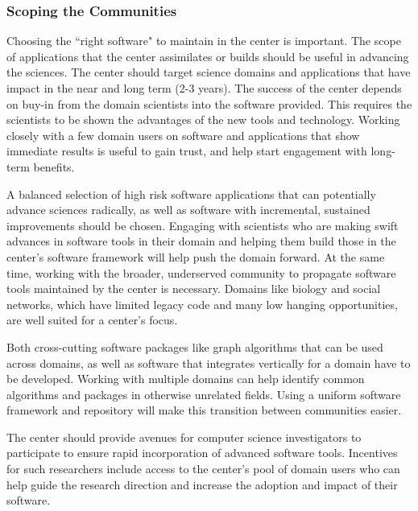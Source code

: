 \subsubsection{Scoping the Communities}
Choosing the ``right software" to maintain in the center is important. The scope of applications that the center assimilates or builds should be useful in advancing the sciences. The center should target science domains and applications that have impact in the near and long term (2-3 years). The success of the center depends on buy-in from the domain scientists into the software provided. This requires the scientists to be shown the advantages of the new tools and technology. Working closely with a few domain users on software and applications that show immediate results is useful to gain trust, and help start engagement with long-term benefits.

A balanced selection of high risk software applications that can potentially advance sciences radically, as well as software with incremental, sustained improvements should be chosen. Engaging with scientists who are making swift advances in software tools in their domain and helping them build those in the center’s software framework will help push the domain forward. At the same time, working with the broader, underserved community to propagate software tools maintained by the center is necessary. Domains like biology and social networks, which have limited legacy code and many low hanging opportunities, are well suited for a center’s focus.

Both cross-cutting software packages like graph algorithms that can be used across domains, as well as software that integrates vertically for a domain have to be developed. Working with multiple domains can help identify common algorithms and packages in otherwise unrelated fields. Using a uniform software framework and repository will make this transition between communities easier.

The center should provide avenues for computer science investigators to participate to ensure rapid incorporation of advanced software tools. Incentives for such researchers include access to the center’s pool of domain users who can help guide the research direction and increase the adoption and impact of their software.
